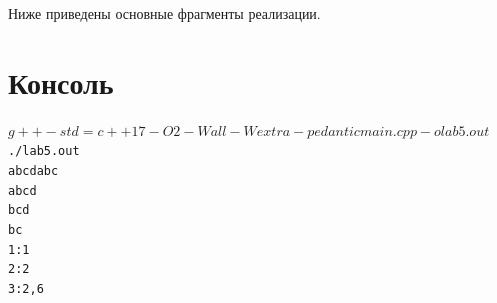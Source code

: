Ниже приведены основные фрагменты реализации.












\pagebreak

\section{Консоль}
\begin{alltt}
$ g++ -std=c++17 -O2 -Wall -Wextra -pedantic main.cpp -o lab5.out
$ ./lab5.out
abcdabc
abcd
bcd
bc
1: 1
2: 2
3: 2, 6
\end{alltt}
\pagebreak
